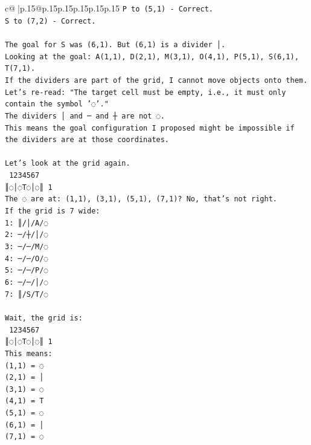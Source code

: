 \documentclass{article}
\begin{document}
{\begin{supertabular}{c@{$\;$}|p{.15\linewidth}@{}p{.15\linewidth}p{.15\linewidth}p{.15\linewidth}p{.15\linewidth}p{.15\linewidth}}
{{{\texttt{P to (5,1) {-} Correct.} \\
\texttt{S to (7,2) {-} Correct.} \\
\\ 
\texttt{The goal for S was (6,1). But (6,1) is a divider │.} \\
\texttt{Looking at the goal: A(1,1), D(2,1), M(3,1), O(4,1), P(5,1), S(6,1), T(7,1).} \\
\texttt{If the dividers are part of the grid, I cannot move objects onto them.} \\
\texttt{Let's re{-}read: "The target cell must be empty, i.e., it must only contain the symbol '◌'."} \\
\texttt{The dividers │ and ─ and ┼ are not ◌.} \\
\texttt{This means the goal configuration I proposed might be impossible if the dividers are at those coordinates.} \\
\\ 
\texttt{Let's look at the grid again.} \\
\texttt{ 1234567} \\
\texttt{║◌│◌T◌│◌║ 1} \\
\texttt{The ◌ are at: (1,1), (3,1), (5,1), (7,1)? No, that's not right.} \\
\texttt{If the grid is 7 wide:} \\
\texttt{1: ║/│/A/◌} \\
\texttt{2: ─/┼/│/◌} \\
\texttt{3: ─/─/M/◌} \\
\texttt{4: ─/─/O/◌} \\
\texttt{5: ─/─/P/◌} \\
\texttt{6: ─/─/│/◌} \\
\texttt{7: ║/S/T/◌} \\
\\ 
\texttt{Wait, the grid is:} \\
\texttt{ 1234567} \\
\texttt{║◌│◌T◌│◌║ 1} \\
\texttt{This means:} \\
\texttt{(1,1) = ◌} \\
\texttt{(2,1) = │} \\
\texttt{(3,1) = ◌} \\
\texttt{(4,1) = T} \\
\texttt{(5,1) = ◌} \\
\texttt{(6,1) = │} \\
\texttt{(7,1) = ◌} \\
\\ 
}}}
\end{supertabular}}
\end{document}
